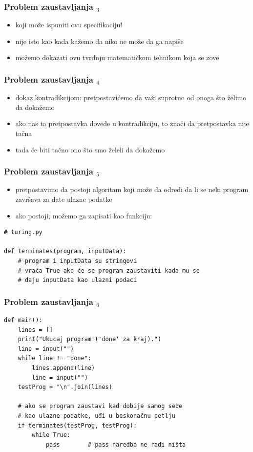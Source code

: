 \documentclass[utf8,compress,aspectratio=169]{beamer}
\begin{document}
\begin{frame}[fragile]
  \frametitle{Problem zaustavljanja $_3$}
  \begin{itemize}
    \item {} koji može ispuniti ovu specifikaciju!
    \item nije isto kao kada kažemo da niko ne može da ga napiše
    \item možemo dokazati ovu tvrdnju matematičkom tehnikom koja se zove 
  \end{itemize}
\end{frame}

\begin{frame}[fragile]
  \frametitle{Problem zaustavljanja $_4$}
  \begin{itemize}
    \item dokaz kontradikcijom: pretpostavićemo da važi suprotno od onoga što želimo da dokažemo
    \item ako nas ta pretpostavka dovede u kontradikciju, to znači da pretpostavka nije tačna
    \item tada će biti tačno ono što smo želeli da dokažemo
  \end{itemize}
\end{frame}

\begin{frame}[fragile]
  \frametitle{Problem zaustavljanja $_5$}
  \begin{itemize}
    \item pretpostavimo da postoji algoritam koji može da odredi da li se neki program završava za date ulazne podatke
    \item ako postoji, možemo ga zapisati kao funkciju:
  \end{itemize}
\begin{verbatim}
# turing.py

def terminates(program, inputData):
    # program i inputData su stringovi
    # vraća True ako će se program zaustaviti kada mu se
    # daju inputData kao ulazni podaci
\end{verbatim}
\end{frame}

\begin{frame}[fragile]
  \frametitle{Problem zaustavljanja $_6$}
\begin{verbatim}
def main():
    lines = []
    print("Ukucaj program ('done' za kraj).")
    line = input("")
    while line != "done":
        lines.append(line)
        line = input("")
    testProg = "\n".join(lines)

    # ako se program zaustavi kad dobije samog sebe
    # kao ulazne podatke, uđi u beskonačnu petlju
    if terminates(testProg, testProg):
        while True:
            pass        # pass naredba ne radi ništa
\end{verbatim}
\end{frame}
\end{document}
